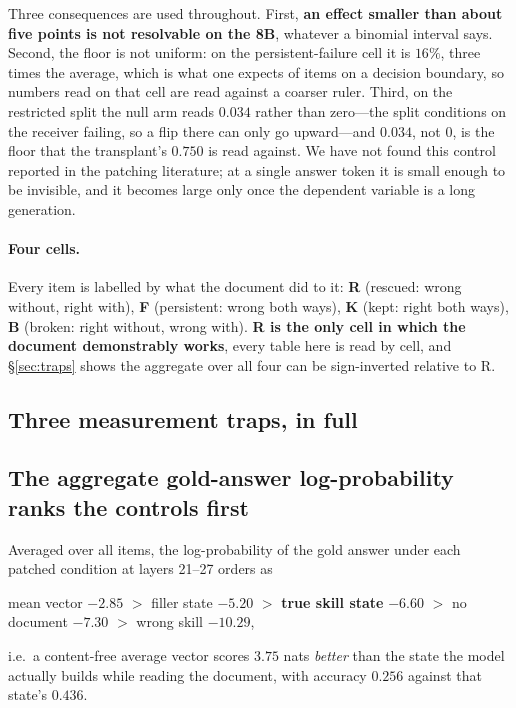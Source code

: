 \documentclass{article}
\begin{document}
Three consequences are used throughout. First, \textbf{an effect smaller than
about five points is not resolvable on the 8B}, whatever a binomial interval
says. Second, the floor is not uniform: on the persistent-failure cell it is
$16\%$, three times the average, which is what one expects of items on a
decision boundary, so numbers read on that cell are read against a coarser
ruler. Third, on the restricted split the null arm reads $0.034$ rather than
zero---the split conditions on the receiver failing, so a flip there can only go
upward---and $0.034$, not $0$, is the floor that the transplant's $0.750$ is
read against. We have not found this control reported in the patching
literature; at a single answer token it is small enough to be invisible, and it
becomes large only once the dependent variable is a long generation.

\paragraph{Four cells.}

Every item is labelled by what the document did to it: \textbf{R} (rescued:
wrong without, right with), \textbf{F} (persistent: wrong both ways), \textbf{K}
(kept: right both ways), \textbf{B} (broken: right without, wrong with).
\textbf{R is the only cell in which the document demonstrably works}, every table
here is read by cell, and \S\ref{sec:traps} shows the aggregate over all four can
be sign-inverted relative to R.




\subsection{Three measurement traps, in full}
\label{app:traps}

\subsection{The aggregate gold-answer log-probability ranks the controls first}

Averaged over all items, the log-probability of the gold answer under each
patched condition at layers 21--27 orders as
\begin{center}
mean vector $-2.85$ \; $>$ \; filler state $-5.20$ \; $>$ \; \textbf{true skill
state} $-6.60$ \; $>$ \; no document $-7.30$ \; $>$ \; wrong skill $-10.29$,
\end{center}
i.e.\ a content-free average vector scores $3.75$ nats \emph{better} than the
state the model actually builds while reading the document, with accuracy
$0.256$ against that state's $0.436$.
\end{document}

